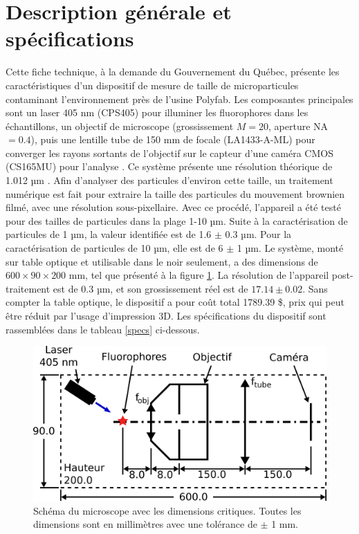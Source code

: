 \documentclass[11pt,letterpaper]{article}
\begin{document}
\section{Description générale et spécifications}

Cette fiche technique, à la demande du Gouvernement du Québec, présente les caractéristiques 
d'un dispositif de mesure de taille de microparticules contaminant l'environnement près de 
l'usine Polyfab. Les composantes principales sont un laser 405 nm (CPS405)
pour illuminer les fluorophores dans les échantillons, un objectif de microscope (grossissement 
$M = 20$, aperture NA $= 0.4$), puis une lentille tube de 150 mm de focale
(LA1433-A-ML) pour converger les rayons sortants de l'objectif sur le capteur d'une caméra CMOS 
(CS165MU) pour l'analyse \cite{noauthor_thorlabs_2024}. Ce système présente une résolution
théorique de 1.012 µm \cite{rouillon_travail_2024}. Afin d'analyser des particules d'environ cette taille, un traitement
numérique est fait pour extraire la taille des particules du mouvement brownien filmé, avec 
une résolution sous-pixellaire. Avec ce procédé, l'appareil a été testé pour des tailles de 
particules dans la plage 1-10 µm. Suite à la caractérisation de particules 
de 1 µm, la valeur identifiée est de 1.6 $\pm$ 0.3 µm.
Pour la caractérisation de particules de 10 µm, elle est de 6 $\pm$ 1 µm. Le système, monté sur table optique et utilisable dans le noir 
seulement, a des dimensions de $600 \times 90 \times 200$ mm, tel que présenté à 
la figure \ref{schema_micro}. La résolution de l'appareil post-traitement est de 0.3 µm, et
son grossissement réel est de $17.14 \pm 0.02$. Sans compter la table optique, le dispositif a pour coût total 1789.39 \$, prix qui
peut être réduit par l'usage d'impression 3D. Les spécifications du dispositif sont rassemblées dans le
tableau \ref{specs} ci-dessous.

\begin{figure}[H]
  \centering
  \includegraphics[scale=2.8]{schema_fiche_tech.png}
  \caption{Schéma du microscope avec les dimensions critiques. Toutes les dimensions sont en millimètres avec une tolérance de $\pm$ 1 mm.}
  \label{schema_micro}
\end{figure}
\end{document}
